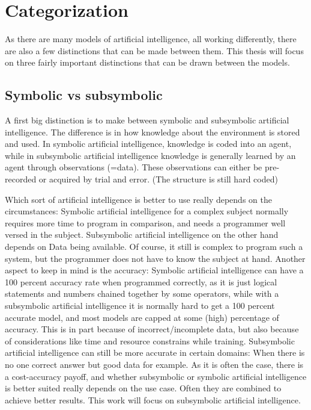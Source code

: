 \chapter{Categorization}
As there are many models of artificial intelligence, all working differently, there are also a few distinctions that can be made between them. This thesis will focus on three fairly important distinctions that can be drawn between the models.
\section{Symbolic vs subsymbolic}
A first big distinction is to make between symbolic and subsymbolic artificial intelligence. 
The difference is in how knowledge about the environment is stored and used. %
In symbolic artificial intelligence, knowledge is coded into an agent, while in subsymbolic artificial intelligence knowledge is generally learned by an agent through observations (=data). These observations can either be pre-recorded or acquired by trial and error. (The structure is still hard coded)

Which sort of artificial intelligence is better to use really depends on the circumstances: 
Symbolic artificial intelligence for a complex subject normally requires more time to program in comparison, and needs a programmer well versed in the subject. 
Subsymbolic artificial intelligence on the other hand depends on Data being available. Of course, it still is complex to program such a system, but the programmer does not have to know the subject at hand. %
Another aspect to keep in mind is the accuracy: Symbolic artificial intelligence can have a 100 percent accuracy rate when programmed correctly, as it is just logical statements and numbers chained together by some operators, while with a subsymbolic artificial intelligence it is normally hard to get a 100 percent accurate model, and most models are capped at some (high) percentage of accuracy. This is in part because of incorrect/incomplete data, but also because of considerations like time and resource constrains while training. Subsymbolic artificial intelligence can still be more accurate in certain domains: When there is no one correct answer but good data for example.
As it is often the case, there is a cost-accuracy payoff, and whether subsymbolic or symbolic artificial intelligence is better suited really depends on the use case. Often they are combined to achieve better results. This work will focus on subsymbolic artificial intelligence. \cite{semisupervised}

